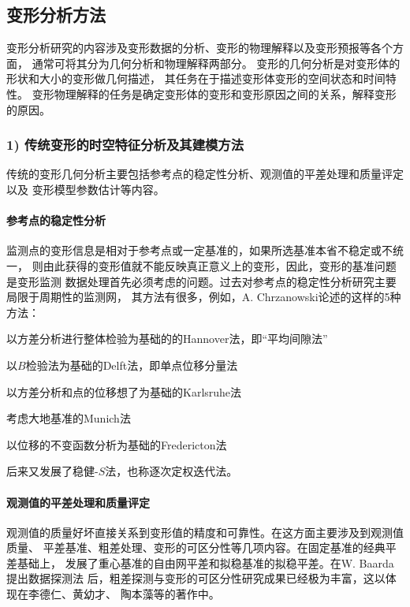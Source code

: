 \subsection{变形分析方法}
变形分析研究的内容涉及变形数据的分析、变形的物理解释以及变形预报等各个方面，
通常可将其分为几何分析和物理解释两部分。
变形的几何分析是对变形体的形状和大小的变形做几何描述，
其任务在于描述变形体变形的空间状态和时间特性。
变形物理解释的任务是确定变形体的变形和变形原因之间的关系，解释变形的原因。

\subsubsection*{1) 传统变形的时空特征分析及其建模方法}
传统的变形几何分析主要包括参考点的稳定性分析、观测值的平差处理和质量评定以及
变形模型参数估计等内容。
\paragraph*{参考点的稳定性分析} 
监测点的变形信息是相对于参考点或一定基准的，如果所选基准本省不稳定或不统一，
则由此获得的变形值就不能反映真正意义上的变形，因此，变形的基准问题是变形监测
数据处理首先必须考虑的问题。过去对参考点的稳定性分析研究主要局限于周期性的监测网，
其方法有很多，例如，A. Chrzanowski论述的这样的5种方法：
\begin{asparaitem}[$\bullet$]
\item 以方差分析进行整体检验为基础的的Hannover法，即“平均间隙法”
\item 以$B$检验法为基础的Delft法，即单点位移分量法
\item 以方差分析和点的位移想了为基础的Karlsruhe法
\item 考虑大地基准的Munich法
\item 以位移的不变函数分析为基础的Fredericton法
\end{asparaitem}
后来又发展了稳健-$S$法，也称逐次定权迭代法。
\paragraph*{观测值的平差处理和质量评定}
观测值的质量好坏直接关系到变形值的精度和可靠性。在这方面主要涉及到观测值质量、
平差基准、粗差处理、变形的可区分性等几项内容。在固定基准的经典平差基础上，
发展了重心基准的自由网平差和拟稳基准的拟稳平差。在W. Baarda提出数据探测法
后，粗差探测与变形的可区分性研究成果已经极为丰富，这以体现在李德仁、黄幼才、
陶本藻等的著作中。
